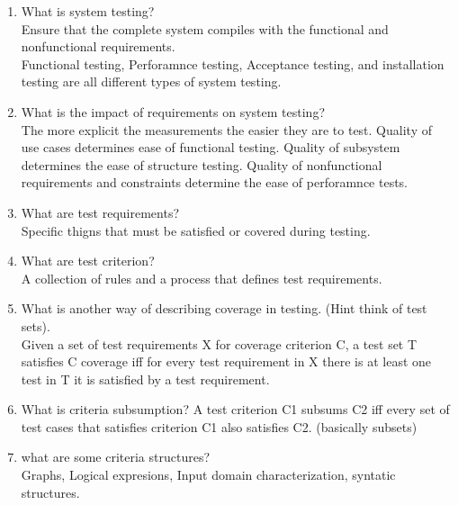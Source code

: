 \documentclass[10pt]{article}
\begin{document}
\begin{enumerate}
      \item What is system testing?\\
            Ensure that the complete system compiles with the functional and nonfunctional requirements.\\
            Functional testing, Perforamnce testing, Acceptance testing, and installation testing are all different types of system testing.\\

      \item What is the impact of requirements on system testing?\\
            The more explicit the measurements the easier they are to test. Quality of use cases determines ease of functional testing. Quality of subsystem determines the ease of structure testing.
            Quality of nonfunctional requirements and constraints determine the ease of perforamnce tests.\\

      \item What are test requirements?\\
            Specific thigns that must be satisfied or covered during testing.\\

      \item What are test criterion?\\
            A collection of rules and a process that defines test requirements.\\

      \item What is another way of describing coverage in testing. (Hint think of test sets).\\
            Given a set of test requirements X for coverage criterion C, a test set T satisfies C coverage iff for every test requirement in X there is at least one test in T it is satisfied by a test requirement.\\

      \item What is criteria subsumption?
            A test criterion C1 subsums C2 iff every set of test cases that satisfies criterion C1 also satisfies C2. (basically subsets)\\

      \item what are some criteria structures?\\
            Graphs, Logical expresions, Input domain characterization, syntatic structures.\\


\end{enumerate}
\end{document}
